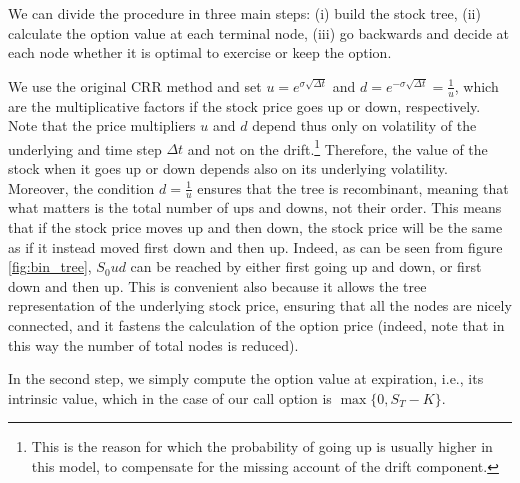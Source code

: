 We can divide the procedure in three main steps: (i) build the stock tree, (ii) calculate the option value at each terminal node, (iii) go backwards and decide at each node whether it is optimal to exercise or keep the option.

We use the original CRR method and set $u = e^{\sigma \sqrt{\Delta t}}$ and $d = e^{-\sigma \sqrt{\Delta t}}=\frac{1}{u}$, which are the multiplicative factors if the stock price goes up or down, respectively. Note that the price multipliers $u$ and $d$ depend thus only on volatility of the underlying and time step $\Delta t$ and not on the drift.\footnote{This is the reason for which the probability of going up is usually higher in this model, to compensate for the missing account of the drift component.} Therefore, the value of the stock when it goes up or down depends also on its underlying volatility. Moreover, the condition $d = \frac{1}{u}$ ensures that the tree is recombinant, meaning that what matters is the total number of ups and downs, not their order. This means that if the stock price moves up and then down, the stock price will be the same as if it instead moved first down and then up. Indeed, as can be seen from figure \ref*{fig:bin_tree}, $S_0ud$ can be reached by either first going up and down, or first down and then up. This is convenient also because it allows the tree representation of the underlying stock price, ensuring that all the nodes are nicely connected, and it fastens the calculation of the option price (indeed, note that in this way the number of total nodes is reduced). 

In the second step, we simply compute the option value at expiration, i.e., its intrinsic value, which in the case of our call option is $\max \{0, S_T - K \}$.

